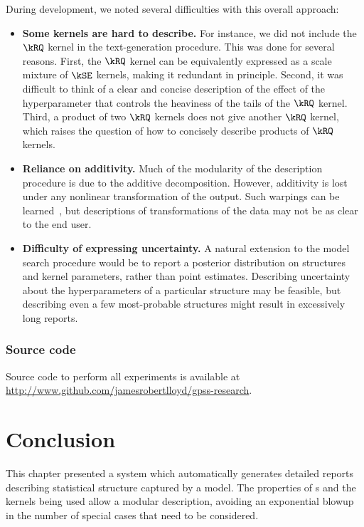 During development, we noted several difficulties with this overall approach:

\begin{itemize}

\item {\bf Some kernels are hard to describe.}
For instance, we did not include the $\kRQ$ kernel in the text-generation procedure.
This was done for several reasons.
First, the $\kRQ$ kernel can be equivalently expressed as a scale mixture of $\kSE$ kernels, making it redundant in principle.
Second, it was difficult to think of a clear and concise description of the effect of the hyperparameter that controls the heaviness of the tails of the $\kRQ$ kernel.
Third, a product of two $\kRQ$ kernels does not give another $\kRQ$ kernel, which raises the question of how to concisely describe products of $\kRQ$ kernels.

\item {\bf Reliance on additivity.}
Much of the modularity of the description procedure is due to the additive decomposition.
However, additivity is lost under any nonlinear transformation of the output.
Such warpings can be learned~\citep{snelson2004warped}, but descriptions of transformations of the data may not be as clear to the end user.

\item {\bf Difficulty of expressing uncertainty.}
A natural extension to the model search procedure would be to report a posterior distribution on structures and kernel parameters, rather than point estimates.
Describing uncertainty about the hyperparameters of a particular structure may be feasible,
but describing even a few most-probable structures might result in excessively long reports.

\end{itemize}


\subsubsection{Source code}
Source code to perform all experiments is available at \\\url{http://www.github.com/jamesrobertlloyd/gpss-research}. 




\section{Conclusion}
This chapter presented a system which automatically generates detailed reports describing statistical structure captured by a \gp{} model.
The properties of \gp{}s and the kernels being used allow a modular description, avoiding an exponential blowup in the number of special cases that need to be considered.

